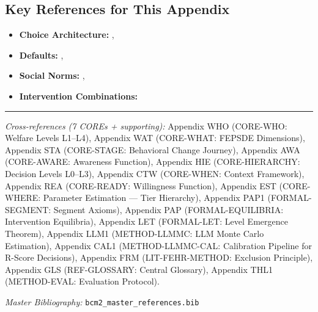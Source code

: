 \subsection{Key References for This Appendix}

\begin{itemize}[nosep]
    \item \textbf{Choice Architecture:} \citet{thalersunstein2008}, \citet{johnson2012}
    \item \textbf{Defaults:} \citet{madrian2001}, \citet{chetty2014}
    \item \textbf{Social Norms:} \citet{allcott2011}, \citet{cialdini2003}
    \item \textbf{Intervention Combinations:} \citet{johnson2021}
\end{itemize}

\nocite{bcm_master}



\vspace{1em}
\hrule
\vspace{0.5em}

\noindent\textit{Cross-references (7 COREs + supporting):}
Appendix WHO (CORE-WHO: Welfare Levels L1--L4),
Appendix WAT (CORE-WHAT: FEPSDE Dimensions),
Appendix STA (CORE-STAGE: Behavioral Change Journey),
Appendix AWA (CORE-AWARE: Awareness Function),
Appendix HIE (CORE-HIERARCHY: Decision Levels L0--L3),
Appendix CTW (CORE-WHEN: Context Framework),
Appendix REA (CORE-READY: Willingness Function),
Appendix EST (CORE-WHERE: Parameter Estimation --- Tier Hierarchy),
Appendix PAP1 (FORMAL-SEGMENT: Segment Axioms),
Appendix PAP (FORMAL-EQUILIBRIA: Intervention Equilibria),
Appendix LET (FORMAL-LET: Level Emergence Theorem),
Appendix LLM1 (METHOD-LLMMC: LLM Monte Carlo Estimation),
Appendix CAL1 (METHOD-LLMMC-CAL: Calibration Pipeline for R-Score Decisions),
Appendix FRM (LIT-FEHR-METHOD: Exclusion Principle),
Appendix GLS (REF-GLOSSARY: Central Glossary),
Appendix THL1 (METHOD-EVAL: Evaluation Protocol).

\noindent\textit{Master Bibliography:} \texttt{bcm2\_master\_references.bib}


